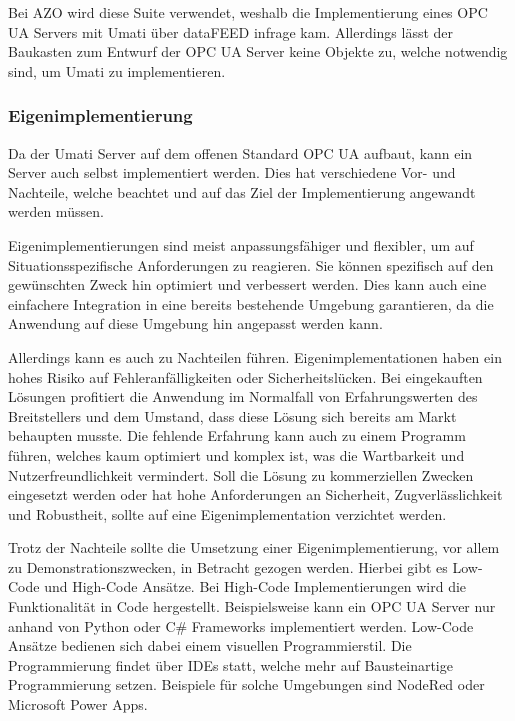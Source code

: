 \documentclass[a4paper, 12pt, oneside, toc=listofnumbered, bibliography=totoc]{scrbook}
\begin{document}
			Bei AZO wird diese Suite verwendet, weshalb die Implementierung eines OPC UA Servers mit Umati über dataFEED infrage kam. Allerdings lässt der Baukasten zum Entwurf der OPC UA Server keine Objekte zu, welche notwendig sind, um Umati zu implementieren.
					
			\subsubsection{Eigenimplementierung}
		
					
			Da der Umati Server auf dem offenen Standard OPC UA aufbaut, kann ein Server auch selbst implementiert werden. Dies hat verschiedene Vor- und Nachteile, welche beachtet und auf das Ziel der Implementierung angewandt werden müssen. 
			
			Eigenimplementierungen sind meist anpassungsfähiger und flexibler, um auf Situationsspezifische Anforderungen zu reagieren. Sie können spezifisch auf den gewünschten Zweck hin optimiert und verbessert werden. Dies kann auch eine einfachere Integration in eine bereits bestehende Umgebung garantieren, da die Anwendung auf diese Umgebung hin angepasst werden kann.
			
			Allerdings kann es auch zu Nachteilen führen. Eigenimplementationen haben ein hohes Risiko auf Fehleranfälligkeiten oder Sicherheitslücken. Bei eingekauften Lösungen profitiert die Anwendung im Normalfall von Erfahrungswerten des Breitstellers und dem Umstand, dass diese Lösung sich bereits am Markt behaupten musste. Die fehlende Erfahrung kann auch zu einem Programm führen, welches kaum optimiert und komplex ist, was die Wartbarkeit und Nutzerfreundlichkeit vermindert. Soll die Lösung zu kommerziellen Zwecken eingesetzt werden oder hat hohe Anforderungen an Sicherheit, Zugverlässlichkeit und Robustheit, sollte auf eine Eigenimplementation verzichtet werden.
			
			Trotz der Nachteile sollte die Umsetzung einer Eigenimplementierung, vor allem zu Demonstrationszwecken, in Betracht gezogen werden. Hierbei gibt es Low-Code und High-Code Ansätze. Bei High-Code Implementierungen wird die Funktionalität in Code hergestellt. Beispielsweise kann ein OPC UA Server nur anhand von Python oder C\# Frameworks implementiert werden. Low-Code Ansätze bedienen sich dabei einem visuellen Programmierstil. Die Programmierung findet über IDEs statt, welche mehr auf Bausteinartige Programmierung setzen. Beispiele für solche Umgebungen sind NodeRed oder Microsoft Power Apps. 
			
\end{document}
